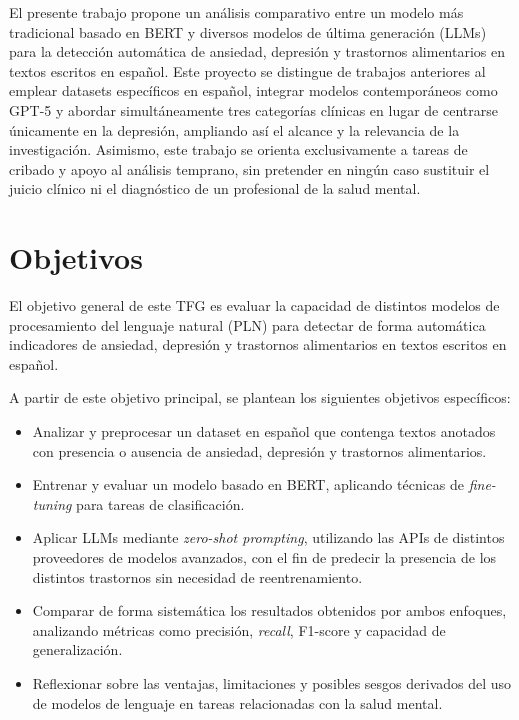 \documentclass[11pt,a4paper,oneside]{article}
\begin{document}
El presente trabajo propone un análisis comparativo entre un modelo más tradicional basado en BERT y diversos modelos de última generación (LLMs) para la detección automática de ansiedad, depresión y trastornos alimentarios en textos escritos en español. Este proyecto se distingue de trabajos anteriores al emplear datasets específicos en español, integrar modelos contemporáneos como GPT-5 y abordar simultáneamente tres categorías clínicas en lugar de centrarse únicamente en la depresión, ampliando así el alcance y la relevancia de la investigación. Asimismo, este trabajo se orienta exclusivamente a tareas de cribado y apoyo al análisis temprano, sin pretender en ningún caso sustituir el juicio clínico ni el diagnóstico de un profesional de la salud mental.


\section{Objetivos}
\label{sec:objetivos-y-campo}

El objetivo general de este TFG es evaluar la capacidad de distintos modelos de procesamiento del lenguaje natural (PLN) para detectar de forma automática indicadores de ansiedad, depresión y trastornos alimentarios en textos escritos en español.

A partir de este objetivo principal, se plantean los siguientes objetivos específicos:

\begin{itemize}
	\item Analizar y preprocesar un dataset en español que contenga textos anotados con presencia o ausencia de ansiedad, depresión y trastornos alimentarios.
	\item Entrenar y evaluar un modelo basado en BERT, aplicando técnicas de \textit{fine-tuning} para tareas de clasificación.
	\item Aplicar LLMs mediante \textit{zero-shot prompting}, utilizando las APIs de distintos proveedores de modelos avanzados, con el fin de predecir la presencia de los distintos trastornos sin necesidad de reentrenamiento.
	\item Comparar de forma sistemática los resultados obtenidos por ambos enfoques, analizando métricas como precisión, \textit{recall}, F1-score y capacidad de generalización.
	\item Reflexionar sobre las ventajas, limitaciones y posibles sesgos derivados del uso de modelos de lenguaje en tareas relacionadas con la salud mental.
\end{itemize}
\end{document}
